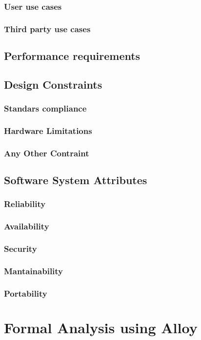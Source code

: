 \documentclass{article}
\begin{document}
\subsubsection{User use cases}
\subsubsection{Third party use cases}
\subsection{Performance requirements}
\subsection{Design Constraints}
\subsubsection{Standars compliance}
\subsubsection{Hardware Limitations}
\subsubsection{Any Other Contraint}
\subsection{Software System Attributes}
\subsubsection{Reliability}
\subsubsection{Availability}
\subsubsection{Security}
\subsubsection{Mantainability}
\subsubsection{Portability}

\newpage
\section{Formal Analysis using Alloy}
\end{document}
